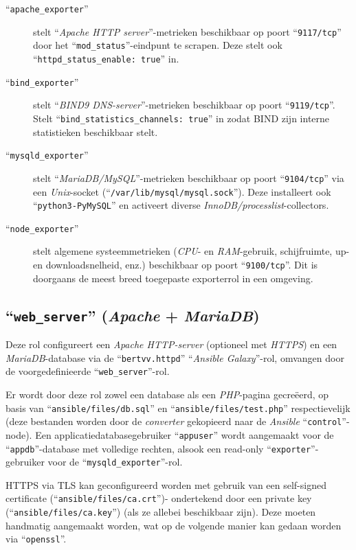\begin{description}
  \item[``\texttt{apache\_exporter}''] stelt ``\emph{Apache HTTP server}''-metrieken beschikbaar op poort ``\texttt{9117/tcp}'' door het ``\texttt{mod\_status}''-eindpunt te scrapen. Deze stelt ook \\``\texttt{httpd\_status\_enable: true}'' in.
  \item[``\texttt{bind\_exporter}''] stelt ``\emph{BIND9 DNS-server}''-metrieken beschikbaar op poort ``\texttt{9119/tcp}''. Stelt ``\texttt{bind\_statistics\_channels: true}'' in zodat BIND zijn interne statistieken beschikbaar stelt.
  \item[``\texttt{mysqld\_exporter}''] stelt ``\emph{MariaDB/MySQL}''-metrieken beschikbaar op poort ``\texttt{9104/tcp}'' via een \emph{Unix}-socket (``\texttt{/var/lib/mysql/mysql.sock}''). Deze installeert ook ``\texttt{python3-PyMySQL}'' en activeert diverse \emph{InnoDB}\emph{/processlist}-collectors.
  \item[``\texttt{node\_exporter}''] stelt algemene systeemmetrieken (\emph{CPU}- en \emph{RAM}-gebruik, schijfruimte, up- en downloadsnelheid, enz.) beschikbaar op poort ``\texttt{9100/tcp}''. Dit is doorgaans de meest breed toegepaste exporterrol in een omgeving.
\end{description}

\subsection{``\texttt{web\_server}'' (\emph{Apache} + \emph{MariaDB})}%
\label{subsec:rol_web_server}

Deze rol configureert een \emph{Apache HTTP-server} (optioneel met \emph{HTTPS}) en een \emph{MariaDB}-database via de ``\texttt{bertvv.httpd}'' ``\emph{Ansible Galaxy}''-rol, omvangen door de voorgedefinieerde ``\texttt{web\_server}''-rol.

Er wordt door deze rol zowel een database als een \emph{PHP}-pagina gecreëerd, op basis van ``\texttt{ansible/files/db.sql}'' en ``\texttt{ansible/files/test.php}'' respectievelijk (deze bestanden worden door de \emph{converter} gekopieerd naar de \emph{Ansible} ``\texttt{control}''-node). Een applicatiedatabasegebruiker ``\texttt{appuser}'' wordt aangemaakt voor de ``\texttt{appdb}''-database met volledige rechten, alsook een read-only ``\texttt{exporter}''-gebruiker voor de ``\texttt{mysqld\_exporter}''-rol.

HTTPS via TLS kan geconfigureerd worden met gebruik van een self-signed certificate (``\texttt{ansible/files/ca.crt}'')- ondertekend door een private key (``\texttt{ansible/files/ca.key}'') (als ze allebei beschikbaar zijn). Deze moeten handmatig aangemaakt worden, wat op de volgende manier kan gedaan worden via ``\texttt{openssl}''.

